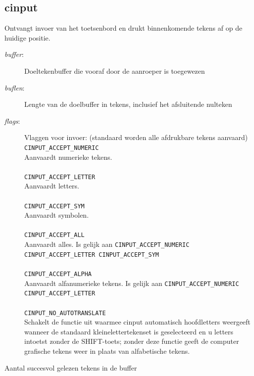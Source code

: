 \subsection{cinput}
\begin{description}[leftmargin=2.4cm,style=nextline]
\item [Beschrijving:] {Ontvangt invoer van het toetsenbord en drukt binnenkomende tekens af op de huidige positie.}\item [Syntaxis:] \item [Parameters:]
\begin{description}
\item [{\em buffer}:] {Doeltekenbuffer die vooraf door de aanroeper is toegewezen}\item [{\em buflen}:] {Lengte van de doelbuffer in tekens, inclusief het afsluitende nulteken}\item [{\em flags}:] {Vlaggen voor invoer:  (standaard worden alle afdrukbare tekens aanvaard)
\texttt{CINPUT\_ACCEPT\_NUMERIC} \\            Aanvaardt numerieke tekens. \\ \\            \texttt{CINPUT\_ACCEPT\_LETTER}  \\            Aanvaardt letters.  \\ \\            \texttt{CINPUT\_ACCEPT\_SYM}  \\            Aanvaardt symbolen.  \\ \\            \texttt{CINPUT\_ACCEPT\_ALL}\\            Aanvaardt alles. Is gelijk aan \texttt{CINPUT\_ACCEPT\_NUMERIC \textbar   CINPUT\_ACCEPT\_LETTER \textbar CINPUT\_ACCEPT\_SYM} \\ \\            \texttt{CINPUT\_ACCEPT\_ALPHA} \\            Aanvaardt alfanumerieke tekens. Is gelijk aan   \texttt{CINPUT\_ACCEPT\_NUMERIC \textbar CINPUT\_ACCEPT\_LETTER} \\ \\            \texttt{CINPUT\_NO\_AUTOTRANSLATE}\\            Schakelt de functie uit waarmee cinput automatisch hoofdletters weergeeft wanneer de standaard kleinelettertekenset is geselecteerd en u letters intoetst zonder de SHIFT-toets; zonder deze functie geeft de computer grafische tekens weer in plaats van alfabetische tekens. \\
            }
\end{description}
\item [Resultaat:] {Aantal succesvol gelezen tekens in de buffer}
\end{description}
